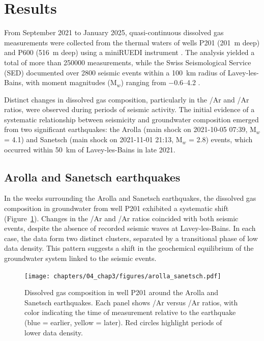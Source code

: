 \section{Results}
From September 2021 to January 2025, quasi-continuous dissolved gas measurements were collected from the thermal waters of wells P201 (\SI{201}{\metre} deep) and P600 (\SI{516}{\metre} deep) using a miniRUEDI instrument \citep{brennwald2016portable, giroud2023new}.
The analysis yielded a total of more than \num{250000} measurements, while the Swiss Seismological Service (SED) documented over \num{2800} seismic events within a \SI{100}{\kilo\meter} radius of Lavey-les-Bains, with moment magnitudes (M$_w$) ranging from \SIrange{-0.6}{4.2}{} \citep{sed2025earthquakes}.

Distinct changes in dissolved gas composition, particularly in the /Ar and /Ar ratios, were observed during periods of seismic activity.
The initial evidence of a systematic relationship between seismicity and groundwater composition emerged from two significant earthquakes: the Arolla (main shock on 2021-10-05 07:39, M$_w$ = 4.1) and Sanetsch (main shock on 2021-11-01 21:13, M$_w$ = 2.8) events, which occurred within \SI{50}{\kilo\meter} of Lavey-les-Bains in late 2021.

\subsection{Arolla and Sanetsch earthquakes}
In the weeks surrounding the Arolla and Sanetsch earthquakes, the dissolved gas composition in groundwater from well P201 exhibited a systematic shift (Figure~\ref{fig:arolla_sanetsch}).
Changes in the /Ar and /Ar ratios coincided with both seismic events, despite the absence of recorded seismic waves at Lavey-les-Bains.
In each case, the data form two distinct clusters, separated by a transitional phase of low data density.
This pattern suggests a shift in the geochemical equilibrium of the groundwater system linked to the seismic events.

\begin{figure}[H]
    \centering
    \texttt{[image: chapters/04\_chap3/figures/arolla\_sanetsch.pdf]}
    \caption{Dissolved gas composition in well P201 around the Arolla and Sanetsch earthquakes.
    Each panel shows /Ar versus /Ar ratios, with color indicating the time of measurement relative to the earthquake (blue = earlier, yellow = later).
    Red circles highlight periods of lower data density.
    }
    \label{fig:arolla_sanetsch}
\end{figure}

